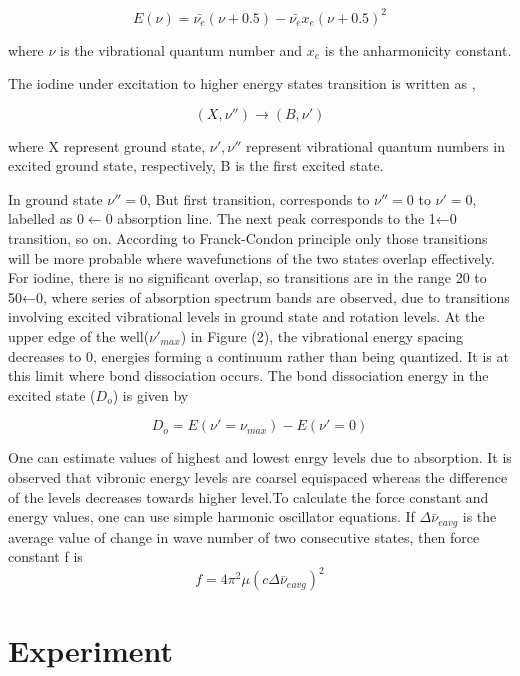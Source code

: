 \documentclass[a4paper, amsfonts, amssymb, amsmath, reprint, showkeys, nofootinbib, twoside]{revtex4-1}
\begin{document}
\begin{equation}
	E(\nu)=\bar{\nu_e}(\nu+0.5)-\bar{\nu_e}x_e(\nu+0.5)^2
\end{equation}

where $\nu$ is the vibrational quantum number and $x_e$ is the anharmonicity constant.

The iodine under excitation to higher energy states transition is written as ,

$$(X,\nu'')\rightarrow(B,\nu')$$

where X represent ground state, $\nu',\nu''$ represent vibrational quantum numbers in excited ground state, respectively, B is the first excited state.

In ground state $\nu''=0$, But first transition, corresponds to $\nu''=0$ to $\nu'=0$, labelled as 0$\leftarrow$0 absorption line. The next peak
corresponds to the 1←0 transition, so on. According to Franck-Condon principle only those transitions will be more probable where wavefunctions of the two states overlap effectively. For iodine, there is no significant overlap, so transitions are in the range 20 to 50←0, where series of absorption spectrum bands are observed, due to transitions involving excited vibrational levels in ground state and rotation levels.  At the upper edge of the well($\nu'_{max}$) in Figure (2), the vibrational energy spacing decreases to 0, energies forming a continuum rather than being quantized. It is at this limit where bond dissociation occurs. The bond dissociation energy in the excited state ($D_o$) is given by

\begin{equation}
	D_o=E(\nu'=\nu_{max}) -E(\nu'=0)
\end{equation}

One can estimate values of highest and lowest enrgy levels due to absorption. It is observed that vibronic energy levels are coarsel equispaced whereas the difference of the levels decreases towards higher level.To calculate the force constant and energy values, one can use simple harmonic oscillator equations. If $\Delta\bar{\nu}_{e avg}$ is the average value of change in wave number of two consecutive states, then force constant f is 
\begin{equation}
	f=4\pi^2\mu(c\Delta\bar{\nu}_{e avg})^2
\end{equation}

\section{Experiment}
\end{document}
